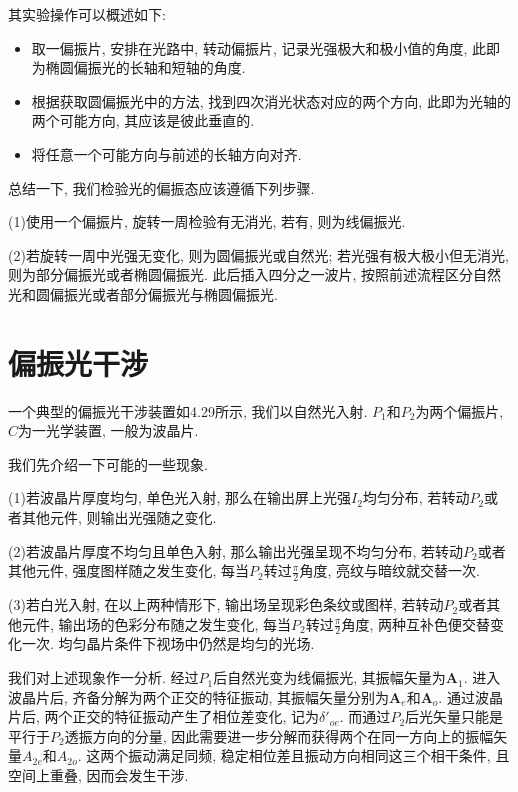 \begin{noteenv}
    其实验操作可以概述如下:
    \begin{itemize}
        \item 取一偏振片, 安排在光路中, 转动偏振片, 记录光强极大和极小值的角度, 此即为椭圆偏振光的长轴和短轴的角度.
        \item 根据获取圆偏振光中的方法, 找到四次消光状态对应的两个方向, 此即为光轴的两个可能方向, 其应该是彼此垂直的.
        \item 将任意一个可能方向与前述的长轴方向对齐.
    \end{itemize}
\end{noteenv}

总结一下, 我们检验光的偏振态应该遵循下列步骤.

(1)使用一个偏振片, 旋转一周检验有无消光, 若有, 则为线偏振光.

(2)若旋转一周中光强无变化, 则为圆偏振光或自然光; 若光强有极大极小但无消光, 则为部分偏振光或者椭圆偏振光. 此后插入四分之一波片, 按照前述流程区分自然光和圆偏振光或者部分偏振光与椭圆偏振光.


\section{偏振光干涉}

一个典型的偏振光干涉装置如4.29所示, 我们以自然光入射. $P_1$和$P_2$为两个偏振片, $C$为一光学装置, 一般为波晶片.

我们先介绍一下可能的一些现象.

(1)若波晶片厚度均匀, 单色光入射, 那么在输出屏上光强$I_2$均匀分布, 若转动$P_2$或者其他元件, 则输出光强随之变化.

(2)若波晶片厚度不均匀且单色入射, 那么输出光强呈现不均匀分布, 若转动$P_2$或者其他元件, 强度图样随之发生变化, 每当$P_2$转过$\frac{\pi}{2}$角度, 亮纹与暗纹就交替一次.

(3)若白光入射, 在以上两种情形下, 输出场呈现彩色条纹或图样, 若转动$P_2$或者其他元件, 输出场的色彩分布随之发生变化, 每当$P_2$转过$\frac{\pi}{2}$角度, 两种互补色便交替变化一次. 均匀晶片条件下视场中仍然是均匀的光场.


我们对上述现象作一分析. 经过$P_1$后自然光变为线偏振光, 其振幅矢量为$\bm{A}_1$. 进入波晶片后, 齐备分解为两个正交的特征振动, 其振幅矢量分别为$\bm{A}_e$和$\bm{A}_o$. 通过波晶片后, 两个正交的特征振动产生了相位差变化, 记为$\delta'_{oe}$. 而通过$P_2$后光矢量只能是平行于$P_2$透振方向的分量, 因此需要进一步分解而获得两个在同一方向上的振幅矢量$A_{2e}$和$A_{2o}$. 这两个振动满足同频, 稳定相位差且振动方向相同这三个相干条件, 且空间上重叠, 因而会发生干涉.

